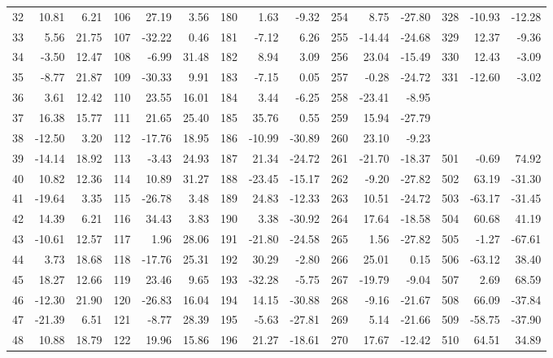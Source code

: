 \begin{table}[!h]
{\begin{tabular}{|r r r||r r r||r r r||r r r||r r r|}
32 &  10.81 &  6.21 & 106 &  27.19 &  3.56 & 180 &   1.63 &  -9.32 & 254 &   8.75 & -27.80 & 328 & -10.93 & -12.28 \\
33 &   5.56 & 21.75 & 107 & -32.22 &  0.46 & 181 &  -7.12 &   6.26 & 255 & -14.44 & -24.68 & 329 &  12.37 &  -9.36 \\
34 &  -3.50 & 12.47 & 108 &  -6.99 & 31.48 & 182 &   8.94 &   3.09 & 256 &  23.04 & -15.49 & 330 &  12.43 &  -3.09 \\
35 &  -8.77 & 21.87 & 109 & -30.33 &  9.91 & 183 &  -7.15 &   0.05 & 257 &  -0.28 & -24.72 & 331 & -12.60 &  -3.02 \\
36 &   3.61 & 12.42 & 110 &  23.55 & 16.01 & 184 &   3.44 &  -6.25 & 258 & -23.41 &  -8.95 &     &        &        \\
37 &  16.38 & 15.77 & 111 &  21.65 & 25.40 & 185 &  35.76 &   0.55 & 259 &  15.94 & -27.79 &     &        &        \\
38 & -12.50 &  3.20 & 112 & -17.76 & 18.95 & 186 & -10.99 & -30.89 & 260 &  23.10 &  -9.23 &     &        &        \\
39 & -14.14 & 18.92 & 113 &  -3.43 & 24.93 & 187 &  21.34 & -24.72 & 261 & -21.70 & -18.37 & 501 &  -0.69 &  74.92 \\
40 &  10.82 & 12.36 & 114 &  10.89 & 31.27 & 188 & -23.45 & -15.17 & 262 &  -9.20 & -27.82 & 502 &  63.19 & -31.30 \\
41 & -19.64 &  3.35 & 115 & -26.78 &  3.48 & 189 &  24.83 & -12.33 & 263 &  10.51 & -24.72 & 503 & -63.17 & -31.45 \\
42 &  14.39 &  6.21 & 116 &  34.43 &  3.83 & 190 &   3.38 & -30.92 & 264 &  17.64 & -18.58 & 504 &  60.68 &  41.19 \\
43 & -10.61 & 12.57 & 117 &   1.96 & 28.06 & 191 & -21.80 & -24.58 & 265 &   1.56 & -27.82 & 505 &  -1.27 & -67.61 \\
44 &   3.73 & 18.68 & 118 & -17.76 & 25.31 & 192 &  30.29 &  -2.80 & 266 &  25.01 &   0.15 & 506 & -63.12 &  38.40 \\
45 &  18.27 & 12.66 & 119 &  23.46 &  9.65 & 193 & -32.28 &  -5.75 & 267 & -19.79 &  -9.04 & 507 &   2.69 &  68.59 \\
46 & -12.30 & 21.90 & 120 & -26.83 & 16.04 & 194 &  14.15 & -30.88 & 268 &  -9.16 & -21.67 & 508 &  66.09 & -37.84 \\
47 & -21.39 &  6.51 & 121 &  -8.77 & 28.39 & 195 &  -5.63 & -27.81 & 269 &   5.14 & -21.66 & 509 & -58.75 & -37.90 \\
48 &  10.88 & 18.79 & 122 &  19.96 & 15.86 & 196 &  21.27 & -18.61 & 270 &  17.67 & -12.42 & 510 &  64.51 &  34.89 \\

\end{tabular}}
\end{table}

